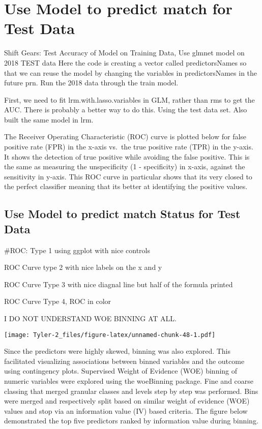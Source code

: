 \documentclass[12pt,]{article}
\begin{document}
\hypertarget{use-model-to-predict-match-for-test-data}{%
\section{Use Model to predict match for Test
Data}\label{use-model-to-predict-match-for-test-data}}

Shift Gears: Test Accuracy of Model on Training Data, Use glmnet model
on 2018 TEST data Here the code is creating a vector called
predictorsNames so that we can reuse the model by changing the variables
in predictorsNames in the future prn. Run the 2018 data through the
train model.

First, we need to fit lrm.with.lasso.variables in GLM, rather than rms
to get the AUC. There is probably a better way to do this. Using the
test data set. Also built the same model in lrm.

The Receiver Operating Characteristic (ROC) curve is plotted below for
false positive rate (FPR) in the x-axis vs.~the true positive rate (TPR)
in the y-axis. It shows the detection of true positive while avoiding
the false positive. This is the same as measuring the unspecificity (1 -
specificity) in x-axis, against the sensitivity in y-axis. This ROC
curve in particular shows that its very closed to the perfect classifier
meaning that its better at identifying the positive values.

\hypertarget{use-model-to-predict-match-status-for-test-data}{%
\subsection{Use Model to predict match Status for Test
Data}\label{use-model-to-predict-match-status-for-test-data}}

\#ROC: Type 1 using ggplot with nice controls

ROC Curve type 2 with nice labels on the x and y

ROC Curve Type 3 with nice diagnal line but half of the formula printed

ROC Curve Type 4, ROC in color

I DO NOT UNDERSTAND WOE BINNING AT ALL.

\texttt{[image: Tyler-2\_files/figure-latex/unnamed-chunk-48-1.pdf]}

Since the predictors were highly skewed, binning was also explored. This
facilitated visualizing associations between binned variables and the
outcome using contingency plots. Supervised Weight of Evidence (WOE)
binning of numeric variables were explored using the woeBinning package.
Fine and coarse classing that merged granular classes and levels step by
step was performed. Bins were merged and respectively split based on
similar weight of evidence (WOE) values and stop via an information
value (IV) based criteria. The figure below demonstrated the top five
predictors ranked by information value during binning.
\end{document}
